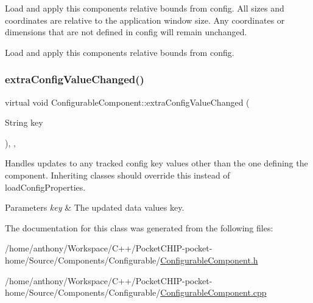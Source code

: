 Load and apply this component\textquotesingle{}s relative bounds from config. All sizes and coordinates are relative to the application window size. Any coordinates or dimensions that are not defined in config will remain unchanged.

Load and apply this component\textquotesingle{}s relative bounds from config. \mbox{\label{classConfigurableComponent_ab6a55a5e7aff6798bdbc5cafa85443d4}} 
\subsubsection{\texorpdfstring{extra\+Config\+Value\+Changed()}{extraConfigValueChanged()}}
{\footnotesize\ttfamily virtual void Configurable\+Component\+::extra\+Config\+Value\+Changed (\begin{DoxyParamCaption}\item[{String}]{key }\end{DoxyParamCaption})\hspace{0.3cm}{\ttfamily [inline]}, {\ttfamily [protected]}, {\ttfamily [virtual]}}

Handles updates to any tracked config key values other than the one defining the component. Inheriting classes should override this instead of load\+Config\+Properties.


\begin{DoxyParams}{Parameters}
{\em key} & The updated data value\textquotesingle{}s key. \\
\hline
\end{DoxyParams}


The documentation for this class was generated from the following files\+:\begin{DoxyCompactItemize}
\item 
/home/anthony/\+Workspace/\+C++/\+Pocket\+C\+H\+I\+P-\/pocket-\/home/\+Source/\+Components/\+Configurable/\mbox{\hyperlink{ConfigurableComponent_8h}{Configurable\+Component.\+h}}\item 
/home/anthony/\+Workspace/\+C++/\+Pocket\+C\+H\+I\+P-\/pocket-\/home/\+Source/\+Components/\+Configurable/\mbox{\hyperlink{ConfigurableComponent_8cpp}{Configurable\+Component.\+cpp}}\end{DoxyCompactItemize}
